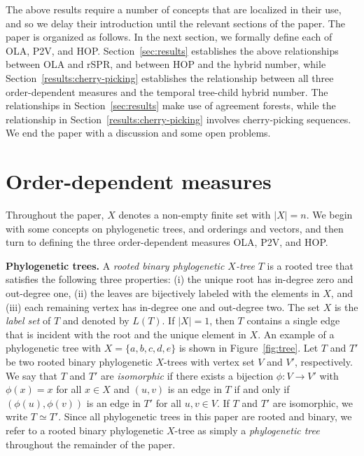 \documentclass{article}
\begin{document}
The above results require a number of concepts that are localized in their use, and so we delay their introduction until the relevant sections of the paper. The paper is organized as follows. In the next section, we formally define each of OLA, P2V, and HOP. Section~\ref{sec:results} establishes the above relationships between OLA and rSPR, and between HOP and the hybrid number, while Section~\ref{results:cherry-picking} establishes the relationship between all three order-dependent measures and the temporal tree-child hybrid number. The relationships in Section~\ref{sec:results} make use of agreement forests, while the relationship in Section~\ref{results:cherry-picking} involves cherry-picking sequences. We end the paper with a discussion and some open problems.

\section{Order-dependent measures}

Throughout the paper, $X$ denotes a non-empty finite set with $|X|=n$. 
We begin with some concepts on phylogenetic trees, and orderings and vectors, and then turn to defining the three order-dependent measures OLA, P2V, and HOP.

\noindent
{\bf Phylogenetic trees.}
A {\em rooted binary phylogenetic $X$-tree} $T$ is a rooted tree that satisfies the following three properties: (i) the unique root has in-degree zero and out-degree one, (ii) the leaves are bijectively labeled with the elements in $X$, and (iii) each remaining vertex has in-degree one and out-degree two. The set $X$ is the {\em label set} of $T$ and denoted by $L(T)$. If $|X|=1$, then $T$ contains a single edge that is incident with the root and the unique element in $X$. An example of a phylogenetic tree with $X=\{a, b, c, d, e\}$ is shown in Figure~\ref{fig:tree}. Let $T$ and $T'$ be two rooted binary phylogenetic $X$-trees with vertex set $V$ and $V'$, respectively. We say that $T$ and $T'$ are {\em isomorphic} if there exists a bijection $\phi: V \rightarrow V'$ with $\phi(x)=x$ for all $x\in X$ and $(u,v)$ is an edge in $T$ if and only if $(\phi(u),\phi(v))$ is an edge in $T'$ for all $u,v\in V$. If $T$ and $T'$ are isomorphic, we write $T\simeq T'$. Since all phylogenetic trees in this paper are rooted and binary, we refer to a rooted binary phylogenetic $X$-tree as simply a {\em phylogenetic tree} throughout the remainder of the paper.
\end{document}

